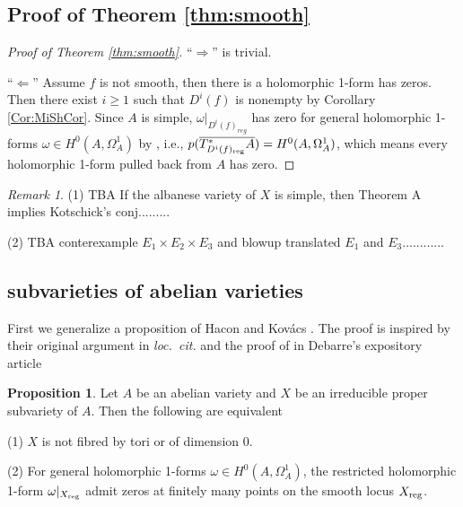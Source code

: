 \documentclass[a4paper,12pt,reqno]{amsart}
\theoremstyle{plain}
\theoremstyle{definition}
\newtheorem{proposition}[theorem]{Proposition}
\theoremstyle{remark}
\newtheorem{remark}[theorem]{Remark}
\begin{document}
\subsection{Proof of Theorem \ref{thm:smooth}}

\begin{proof}[Proof of Theorem \ref{thm:smooth}]
``$\Rightarrow$'' is trivial.

``$\Leftarrow$'' Assume $f$ is not smooth, then there is a holomorphic 1-form has zeros. Then there exist $i\geq 1$ such that $D^i(f)$ is nonempty by Corollary \ref{Cor:MiShCor}. Since $A$ is simple, $\omega|_{D^i(f)_{reg}}$ has zero for general holomorphic 1-forms $\omega\in H^0(A, \Omega_A^1)$ by \cite[Proposition 3.1]{HK05}, i.e.,  $p(\overline{T^*_{D^i(f)_{\textnormal{reg}}}A})=H^0(A, \Omega_A^1)$, which means every holomorphic 1-form pulled back from $A$ has zero.
\end{proof}


\begin{remark}
(1) {\color{red}TBA If the albanese variety of $X$ is simple, then Theorem A implies Kotschick's conj.........}

(2) {\color{red} TBA conterexample $E_1\times E_2\times E_3$ and blowup translated $E_1$ and $E_3$............}
\end{remark}

\subsection{subvarieties of abelian varieties}

First we generalize a proposition of Hacon and Kov\'acs \cite[Proposition 3.1]{HK05}. The proof is inspired
by their original argument in \textit{loc.\ cit.} and the proof of \cite[Lemma 3.1]{Deb} in Debarre's expository article

\begin{proposition}\label{van-nonsimple}
Let $A$ be an abelian variety and $X$ be an irreducible proper subvariety of $A$. Then the following are equivalent

(1) $X$ is not fibred by tori or of dimension 0. 

(2) For general holomorphic 1-forms $\omega\in H^0(A, \Omega_A^1)$, the restricted holomorphic 1-form $\omega|_{X_{\textnormal{reg}}}$ admit zeros at finitely many points on the smooth locus $X_{\textnormal{reg}}$.
\end{proposition}
\end{document}
